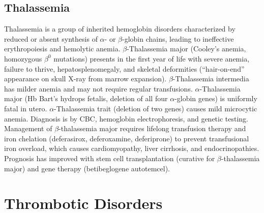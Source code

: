 \subsection{Thalassemia}
\label{sec:Thalassemia}
Thalassemia is a group of inherited hemoglobin disorders characterized by reduced or absent synthesis of $\alpha$- or $\beta$-globin chains, leading to ineffective erythropoiesis and hemolytic anemia. $\beta$-Thalassemia major (Cooley's anemia, homozygous $\beta^0$ mutations) presents in the first year of life with severe anemia, failure to thrive, hepatosplenomegaly, and skeletal deformities (``hair-on-end'' appearance on skull X-ray from marrow expansion). $\beta$-Thalassemia intermedia has milder anemia and may not require regular transfusions. $\alpha$-Thalassemia major (Hb Bart's hydrops fetalis, deletion of all four $\alpha$-globin genes) is uniformly fatal in utero. $\alpha$-Thalassemia trait (deletion of two genes) causes mild microcytic anemia. Diagnosis is by CBC, hemoglobin electrophoresis, and genetic testing. Management of $\beta$-thalassemia major requires lifelong transfusion therapy and iron chelation (deferasirox, deferoxamine, deferiprone) to prevent transfusional iron overload, which causes cardiomyopathy, liver cirrhosis, and endocrinopathies. Prognosis has improved with stem cell transplantation (curative for $\beta$-thalassemia major) and gene therapy (betibeglogene autotemcel).

\section{Thrombotic Disorders}








\label{sec:Thrombotic Disorders}

